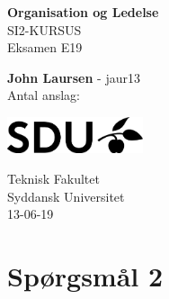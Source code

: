 \documentclass{article}
\begin{document}
\begin{titlepage}
    \begin{center}
        \vspace*{1cm}
        
        {\huge \textbf{Organisation og Ledelse}}
        \\SI2-KURSUS
        \\\vspace{0.5cm}
        Eksamen E19
        
        \vspace{1.5cm}
        
        \textbf{John Laursen} - jaur13 \\
        \vspace{2cm}
        Antal anslag:
        \vspace{12cm}
        
        \hspace*{1.9cm}
        \includegraphics[width=0.3\textwidth]{assets/SDU_BLACK_RGB.png}
        
        Teknisk Fakultet \\
        Syddansk Universitet\\
        13-06-19
    \end{center}
\end{titlepage}
\tableofcontents
\newpage

\clearpage
\section{Spørgsmål 2}

\newpage
\printbibliography[title = {Kilder}]
\end{document}
